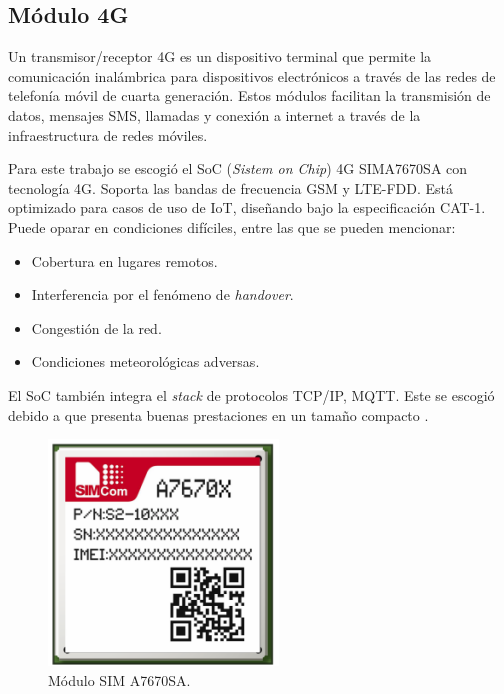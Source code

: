  

\subsection{Módulo 4G}
\label{sec:SIMA7670SA}

Un transmisor/receptor 4G es un dispositivo terminal que permite la comunicación inalámbrica para dispositivos electrónicos a través de las redes de telefonía móvil de cuarta generación. Estos módulos facilitan la transmisión de datos, mensajes SMS, llamadas y conexión a internet a través de la infraestructura de redes móviles.

Para este trabajo se escogió el SoC (\textit{Sistem on Chip}) 4G SIMA7670SA con tecnología 4G. Soporta las bandas de frecuencia GSM y LTE-FDD. Está optimizado para casos de uso de IoT, diseñando bajo la especificación CAT-1. Puede oparar en condiciones difíciles, entre las que se pueden mencionar:
\begin{itemize} 
    \item Cobertura en lugares remotos.
    \item Interferencia por el fenómeno de \textit{handover}.
    \item Congestión de la red.
    \item Condiciones meteorológicas adversas. 
\end{itemize}

El SoC también integra el \textit{stack} de protocolos TCP/IP, MQTT. Este se escogió debido a que presenta buenas prestaciones en un tamaño compacto \citep{A7670SA}. 

\vspace{1cm}

\begin{figure}[htbp]
	\centering
	\includegraphics[width=.5\textwidth]{./Figures/A7670SA.jpg}
	\caption{Módulo SIM A7670SA\protect\footnotemark.}
	\label{fig:A7670SA}
\end{figure}

